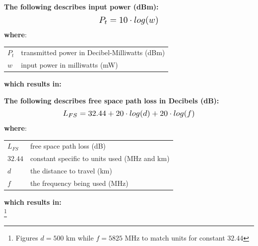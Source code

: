 \documentclass[11pt]{article}
\begin{document}
\begin{center}
\newenvironment{conditions}
  {\par\vspace{\abovedisplayskip}\noindent\begin{tabular}{>{$}l<{$} @{${}={}$} l}}
  {\end{tabular}\par\vspace{\belowdisplayskip}}

\textbf{The following describes input power (dBm):}
\begin{equation}
\resizebox{.25\hsize}{!}{$P_t = 10 \cdot log(w)$}
\end{equation}
\textbf{where}:
\begin{conditions}
 P_t     &  transmitted power in Decibel-Milliwatts (dBm) \\
 w       &  input power in milliwatts (mW) \\
\end{conditions}

\textbf{which results in:} \\
\medskip
{}
\bigskip


\bigskip
\textbf{The following describes free space path loss in Decibels (dB):}
\begin{equation}
\resizebox{.55\hsize}{!}{$L_{FS} = 32.44 + 20 \cdot log(d) + 20 \cdot log(f)$}
\end{equation}
\textbf{where}:
\begin{conditions}
 L_{FS}     &  free space path loss (dB) \\
 32.44      &  constant specific to units used (MHz and km) \\
 d          &  the distance to travel (km)\\
 f          &  the frequency being used (MHz) \\
\end{conditions}

\textbf{which results in:} \\
\medskip
{} \footnote{Figures $d = 500$ km while $f = 5825$ MHz to match units for constant $32.44$}



\end{center}
\end{document}
